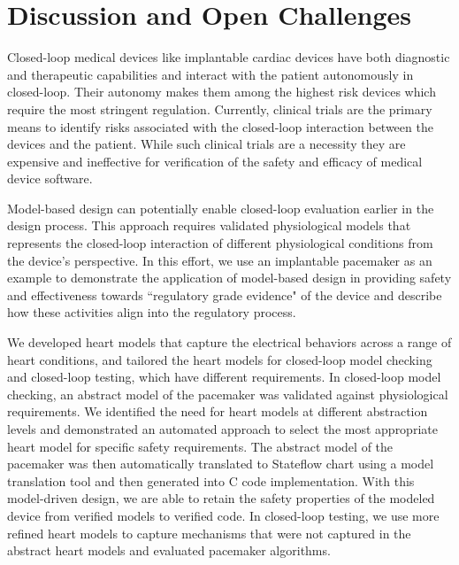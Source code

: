 \chapter{Discussion and Open Challenges}
Closed-loop medical devices like implantable cardiac devices have both diagnostic and therapeutic capabilities and interact with the patient autonomously in closed-loop. Their autonomy makes them among the highest risk devices which require the most stringent regulation. Currently, clinical trials are the primary means to identify risks associated with the closed-loop interaction between the devices and the patient. While such clinical trials are a necessity they are expensive and ineffective for verification of the safety and efficacy of medical device software. 

Model-based design can potentially enable closed-loop evaluation earlier in the design process. This approach requires validated physiological models that represents the closed-loop interaction of different physiological conditions from the device's perspective. In this effort, we use an implantable pacemaker as an example to demonstrate the application of model-based design in providing safety and effectiveness towards ``regulatory grade evidence" of the device and describe how these activities align into the regulatory process. 

We developed heart models that capture the electrical behaviors across a range of heart conditions, and tailored the heart models for closed-loop model checking and closed-loop testing, which have different requirements. In closed-loop model checking, an abstract model of the pacemaker was validated against physiological requirements. We identified the need for heart models at different abstraction levels and demonstrated an automated approach to select the most appropriate heart model for specific safety requirements. The abstract model of the pacemaker was then automatically translated to Stateflow chart using a model translation tool and then generated into C code implementation. With this model-driven design, we are able to retain the safety properties of the modeled device from verified models to verified code. In closed-loop testing, we use more refined heart models to capture mechanisms that were not captured in the abstract heart models and evaluated pacemaker algorithms. 

